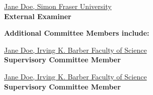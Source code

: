 \vspace{\linespace}

\noindent\underline{Jane Doe, Simon Fraser University} 
\\
\textbf{External Examiner}

\vspace{2\linespace}

\noindent\textbf{Additional Committee Members include:}

\vspace{\linespace}

\noindent\underline{Jane Doe, Irving K. Barber Faculty of Science} 
\\
\textbf{Supervisory Committee Member}

\vspace{\linespace}

\noindent\underline{Jane Doe, Irving K. Barber Faculty of Science} 
\\
\textbf{Supervisory Committee Member}

\normalsize

\newpage


\begin{abstract}                %
The abstract:
\begin{itemize}
    \item Is a concise and accurate summary of the thesis.
    \item Should state the problem, the methods of investigation, and the general conclusions.
    \item Must not contain tables, graphs or illustrations.
    \item Must not exceed 350 words.
    \item Should contain keywords that will facilitate automated information retrieval.
    \item Must be the only abstract in the thesis.
\end{itemize}


\end{abstract}

